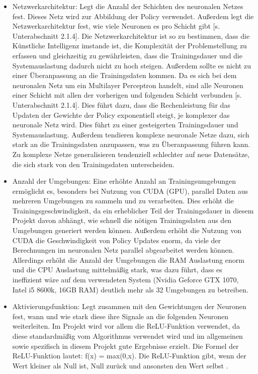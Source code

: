 \begin{itemize} 
\item Netzwerkarchitektur: Legt die Anzahl der Schichten des neuronalen Netzes fest. Dieses Netz wird zur Abbildung der Policy verwendet. Außerdem legt die Netzwerkarchitektur fest, wie viele Neuronen es pro Schicht gibt [s. Unterabschnitt 2.1.4]. Die Netzwerkarchitektur ist so zu bestimmen, dass die Künstliche Intelligenz imstande ist, die Komplexität der Problemstellung zu erfassen und gleichzeitig zu gewährleisten, dass die Trainingsdauer und die Systemauslastung dadurch nicht zu hoch steigen. Außerdem sollte es nicht zu einer Überanpassung an die Trainingsdaten kommen. Da es sich bei dem neuronalen Netz um ein Multilayer Perceptron handelt, sind alle Neuronen einer Schicht mit allen der vorherigen und folgenden Schicht verbunden [s. Unterabschnitt 2.1.4]. Dies führt dazu, dass die Rechenleistung für das Updaten der Gewichte der Policy exponentiell steigt, je komplexer das neuronale Netz wird. Dies führt zu einer gesteigerten Trainingsdauer und Systemauslastung. Außerdem tendieren komplexe neuronale Netze dazu, sich stark an die Trainingsdaten anzupassen, was zu Überanpassung führen kann. Zu komplexe Netze generalisieren tendenziell schlechter auf neue Datensätze, die sich stark von den Trainingsdaten unterscheiden.

\item Anzahl der Umgebungen: Eine erhöhte Anzahl an Trainingsumgebungen ermöglicht es, besonders bei Nutzung von CUDA (GPU), parallel Daten aus mehreren Umgebungen zu sammeln und zu verarbeiten. Dies erhöht die Trainingsgeschwindigkeit, da ein erheblicher Teil der Trainingsdauer in diesem Projekt davon abhängt, wie schnell die nötigen Trainingsdaten aus den Umgebungen generiert werden können. Außerdem erhöht die Nutzung von CUDA die Geschwindigkeit von Policy Updates enorm, da viele der Berechnungen im neuronalen Netz parallel abgearbeitet werden können. Allerdings erhöht die Anzahl der Umgebungen die RAM Auslastung enorm und die CPU Auslastung mittelmäßig stark, was dazu führt, dass es ineffizient wäre auf dem verwendeten System (Nvidia Geforce GTX 1070, Intel i5 8600k, 16GB RAM) deutlich mehr als 32 Umgebungen zu betreiben.

\item Aktivierungsfunktion: Legt zusammen mit den Gewichtungen der Neuronen fest, wann und wie stark diese ihre Signale an die folgenden Neuronen weiterleiten. Im Projekt wird vor allem die ReLU-Funktion verwendet, da diese standardmäßig vom Algorithmus verwendet wird und im allgemeinen sowie spezifisch in diesem Projekt gute Ergebnisse erzielt. Die Formel der ReLU-Funktion lautet: f(x) = max(0,x). Die ReLU-Funktion gibt, wenn der Wert kleiner als Null ist, Null zurück und ansonsten den Wert selbst \cite{schmidt-hieber_nonparametric_2020}.
\end{itemize} 

